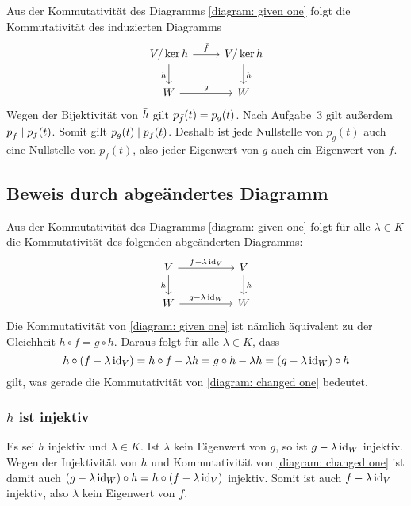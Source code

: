 Aus der Kommutativität des Diagramms \eqref{diagram: given one} folgt die Kommutativität des induzierten Diagramms
\[
  \begin{tikzcd}
      V/\ker h
      \arrow{r}{\induced{f}}
      \arrow[swap]{d}{\induced{h}}
    & V/\ker h
      \arrow{d}{\induced{h}}
    \\
      W
      \arrow{r}{g}
    & W
  \end{tikzcd}
\]
Wegen der Bijektivität von $\bar{h}$ gilt $p_{\bar{f}}(t) = p_g(t)$.
Nach Aufgabe~3 gilt außerdem $p_{\bar{f}} \mathrel{|} p_f(t)$.
Somit gilt $p_g(t) \mathrel{|} p_f(t)$.
Deshalb ist jede Nullstelle von $p_g(t)$ auch eine Nullstelle von $p_f(t)$, also jeder Eigenwert von $g$ auch ein Eigenwert von $f$.





\subsection*{Beweis durch abgeändertes Diagramm}

Aus der Kommutativität des Diagramms \eqref{diagram: given one} folgt für alle $\lambda \in K$ die Kommutativität des folgenden abgeänderten Diagramms:
\begin{equation}
  \label{diagram: changed one}
  \begin{tikzcd}[column sep = huge]
      V
      \arrow{r}{f - \lambda \id_V}
      \arrow[swap]{d}{h}
    & V
      \arrow{d}{h}
    \\
      W
      \arrow{r}{g - \lambda \id_W}
    & W
  \end{tikzcd}
\end{equation}
Die Kommutativität von \eqref{diagram: given one} ist nämlich äquivalent zu der Gleichheit $h \circ f = g \circ h$.
Daraus folgt für alle $\lambda \in K$, dass
\[
    h \circ (f - \lambda \operatorname{id}_V)
  = h \circ f - \lambda h
  = g \circ h - \lambda h
  = (g - \lambda \operatorname{id}_W) \circ h
\]
gilt, was gerade die Kommutativität von \eqref{diagram: changed one} bedeutet.



\subsubsection{\texorpdfstring{$h$}{h} ist injektiv}

Es sei $h$ injektiv und $\lambda \in K$.
Ist $\lambda$ kein Eigenwert von $g$, so ist $g - \lambda \operatorname{id}_W$ injektiv.
Wegen der Injektivität von $h$ und Kommutativität von \eqref{diagram: changed one} ist damit auch $(g - \lambda \operatorname{id}_W) \circ h = h \circ (f - \lambda \operatorname{id}_V)$ injektiv.
Somit ist auch $f - \lambda \operatorname{id}_V$ injektiv, also $\lambda$ kein Eigenwert von $f$.



